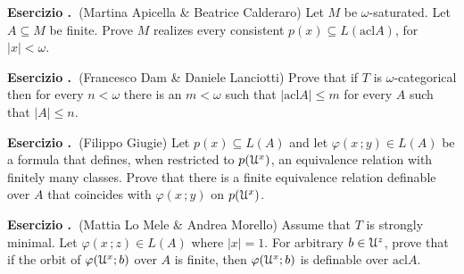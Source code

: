 \documentclass[10pt]{article}
\def\phi{\varphi}
\def\U{\EuScript U}
\def\acl{\textrm{acl}}
\newcounter{ex}
\newenvironment{exercise}{\bigskip\addtocounter{ex}{1}\textbf{Esercizio \theex.\ }}{}
\begin{document}
\begin{exercise}(Martina Apicella \& Beatrice Calderaro)
Let $M$ be $\omega$-saturated.
Let $A\subseteq M$ be finite.
Prove $M$ realizes every consistent $p(x)\subseteq L(\acl A)$, for $|x|<\omega$.
\end{exercise}

\begin{exercise}(Francesco Dam \& Daniele Lanciotti)
  Prove that if $T$ is $\omega$-categorical then for every $n<\omega$ there is an $m<\omega$ such that $|\acl A|\le m$ for every $A$ such that $|A|\le n$.
\end{exercise}

\begin{exercise}(Filippo Giugie)
Let $p(x)\subseteq L(A)$ and let $\phi(x\,;y)\in L(A)$ be a formula that defines, when restricted to $p(\U^x)$, an equivalence relation with finitely many classes.
Prove that there is a finite equivalence relation definable over $A$ that coincides with $\phi(x\,;y)$ on $p(\U^x)$.
\end{exercise}

\begin{exercise}(Mattia Lo Mele \& Andrea Morello)
Assume that $T$ is strongly minimal.
Let $\phi(x\,;z)\in L(A)$ where $|x|=1$.
For arbitrary $b\in\U^z$, prove that if the orbit of $\phi(\U^x; b)$ over $A$ is finite, then $\phi(\U^x; b)$ is definable over $\acl A$.
\end{exercise}
\end{document}
